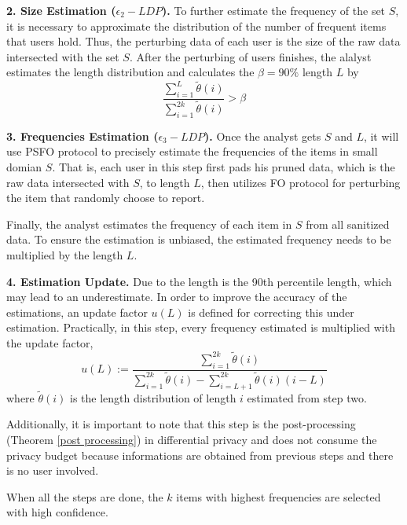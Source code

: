 \documentclass[conference]{IEEEtran}
\begin{document}
\textbf{2. Size Estimation ($\epsilon_2-LDP$).} To further estimate the frequency of the set $S$, it is necessary to approximate the distribution of the number of frequent items that users hold. Thus, the perturbing data of each user is the size of the raw data intersected with the set $S$. After the perturbing of users finishes, the alalyst estimates the length distribution and calculates the $\beta = 90\%$ length $L$ by  
\begin{equation}
\frac{\sum_{i=1}^{L} \tilde{\theta}(i)}{\sum_{i=1}^{2k} \tilde{\theta}(i)} > \beta
\end{equation}

\textbf{3. Frequencies Estimation ($\epsilon_3-LDP$).} Once the analyst gets $S$ and $L$, it will use PSFO protocol to precisely estimate the frequencies of the items in small domian $S$. That is, each user in this step first pads his pruned data, which is the raw data intersected with $S$, to length $L$, then
utilizes FO protocol for perturbing the item that randomly choose to report. 

Finally, the analyst estimates the frequency of each item in $S$ from all sanitized data. To ensure the estimation is unbiased, the estimated frequency needs to be multiplied by the length $L$.

\textbf{4. Estimation Update.} Due to the length is the 90th percentile length, which may lead to an underestimate. In order to improve the accuracy of the estimations, an update factor $u(L)$ is defined for correcting this under estimation. Practically, in this step, every frequency estimated is multiplied with the update factor,
$$u(L) := \frac{\sum_{i=1}^{2k} \tilde{\theta}(i)}{\sum_{i=1}^{2k} \tilde{\theta}(i) - \sum_{i=L+1}^{2k} \tilde{\theta}(i)(i-L) }$$
where $\tilde{\theta}(i)$ is the length distribution of length $i$ estimated from step two.

Additionally, it is important to note that this step is the post-processing (Theorem \ref{post processing}) in differential privacy and does not consume the privacy budget because informations are obtained from previous steps and there is no user involved. 

When all the steps are done, the $k$ items with highest frequencies are selected with high confidence.

\end{document}
